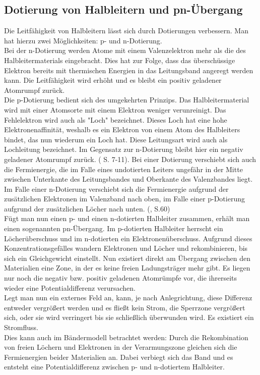 

\subsection{Dotierung von Halbleitern und pn-Übergang}
Die Leitfähigkeit von Halbleitern lässt sich durch Dotierungen verbessern. Man hat hierzu zwei Möglichkeiten: p- und n-Dotierung. \\
Bei der n-Dotierung werden Atome mit einem Valenzelektron mehr als die des Halbleitermaterials eingebracht. Dies hat zur Folge, dass das 
überschüssige Elektron bereits mit thermischen Energien in das Leitungsband angeregt werden kann. Die Leitfähigkeit wird erhöht und es 
bleibt ein positiv geladener Atomrumpf zurück.\\
Die p-Dotierung bedient sich des umgekehrten Prinzips. Das Halbleitermaterial wird mit einer Atomsorte mit einem Elektron weniger 
verunreinigt. Das Fehlelektron wird auch als "Loch" bezeichnet. Dieses Loch hat eine hohe Elektronenaffinität, weshalb es ein Elektron 
von einem Atom des Halbleiters bindet, das nun wiederum ein Loch hat. Diese Leitungsart wird auch als Lochleitung bezeichnet. 
Im Gegensatz zur n-Dotierung bleibt hier ein negativ geladener Atomrumpf zurück. 
(\cite{Goebel2019} S. 7-11). Bei einer Dotierung verschiebt sich auch die Fermienergie, 
die im Falle eines undotierten Leiters ungefähr in der Mitte zwischen Unterkante des Leitungsbandes und Oberkante des Valenzbandes 
liegt. Im Falle einer n-Dotierung verschiebt sich die Fermienergie aufgrund der zusätzlichen Elektronen im Valenzband nach oben, 
im Falle einer p-Dotierung aufgrund der zusätzlichen Löcher nach unten. (\cite{Wellmann2019}, S.60)\\
Fügt man nun einen p- und einen n-dotierten Halbleiter zusammen, erhält man einen sogenannten pn-Übergang. Im p-dotierten Halbleiter 
herrscht ein Löcherüberschuss und im n-dotierten ein Elektronenüberschuss. Aufgrund dieses Konzentrationsgefälles wandern Elektronen 
und Löcher und rekombinieren, bis sich ein Gleichgewicht einstellt. Nun existiert direkt am Übergang zwischen den Materialien eine 
Zone, in der es keine freien Ladungsträger mehr gibt. Es liegen nur noch die negativ bzw. positiv geladenen Atomrümpfe vor, die 
ihrerseits wieder eine Potentialdifferenz verursachen.\\
Legt man nun ein externes Feld an, kann, je nach Anlegrichtung, diese Differenz entweder vergrößert werden und es fließt kein Strom, 
die Sperrzone vergrößert sich, oder sie wird verringert bis sie schließlich überwunden wird. Es existiert ein Stromfluss. \\
Dies kann auch im Bändermodell betrachtet werden: Durch die Rekombination von freien Löchern und Elektronen in der Verarmungszone 
gleichen sich die Fermienergien beider Materialien an. Dabei verbiegt sich das Band und es entsteht eine Potentialdifferenz zwischen 
p- und n-dotiertem Halbleiter. \\

